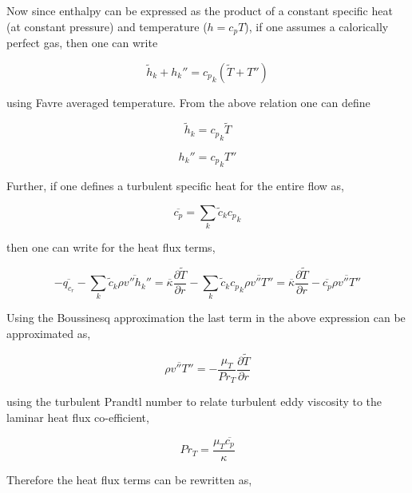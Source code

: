 	Now since enthalpy can be expressed as the product of a constant specific heat (at constant pressure) and temperature
($h=c_p T$), if one assumes a calorically perfect gas, then one can write

\begin{displaymath}
	\tilde h_k + h_k'' = {c_p}_k (\tilde T + T'') 
\end{displaymath}

	using Favre averaged temperature.  From the above relation one can define

\begin{equation}
	\tilde h_k = {c_p}_k \tilde T
\label{eqn:enthturb}
\end{equation}

\begin{equation}
	h_k'' = {c_p}_k T''
\label{eqn:flucenthturb}
\end{equation}

	Further, if one defines a turbulent specific heat for the entire flow as,

\begin{equation}
	\overline{c_p} = \sum_{k} \tilde c_k {c_p}_k
\label{eqn:cpturb}
\end{equation}

	then one can write for the heat flux terms,

\begin{displaymath}
	-\overline{q_{c_r}} - \sum_k \tilde c_k \overline{\rho v'' h_k''} = 
	\overline{\kappa}\frac{\partial \tilde T}{\partial r} - \sum_k \tilde c_k {c_p}_k \overline{\rho v'' T''} = 
	\overline{\kappa}\frac{\partial \tilde T}{\partial r} - \overline{c_p} \overline{\rho v'' T''}	
\end{displaymath}

	Using the Boussinesq approximation the last term in the above expression can be approximated as,

\begin{equation}
	\overline{\rho v'' T''} = -\frac{\mu_T}{Pr_T}\frac{\partial \tilde T}{\partial r}
\label{eqn:heatfluxapprox}
\end{equation}

	using the turbulent Prandtl number to relate turbulent eddy viscosity to the laminar heat flux
co-efficient,

\begin{equation}
	Pr_T = \frac{\mu_T \overline{c_p}}{\kappa}
\label{eqn:prandtl}
\end{equation}

	Therefore the heat flux terms can be rewritten as,

